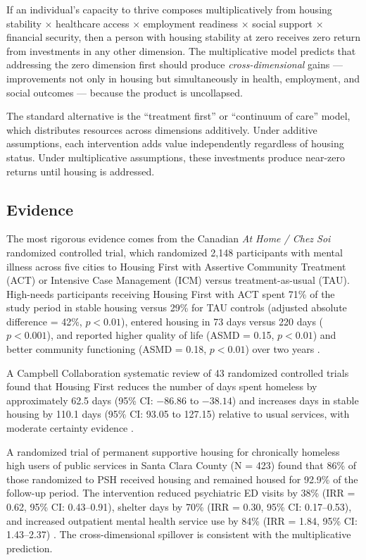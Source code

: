\documentclass[12pt]{article}
\begin{document}
If an individual's capacity to thrive composes multiplicatively from housing stability $\times$ healthcare access $\times$ employment readiness $\times$ social support $\times$ financial security, then a person with housing stability at zero receives zero return from investments in any other dimension. The multiplicative model predicts that addressing the zero dimension first should produce \emph{cross-dimensional} gains --- improvements not only in housing but simultaneously in health, employment, and social outcomes --- because the product is uncollapsed.

The standard alternative is the ``treatment first'' or ``continuum of care'' model, which distributes resources across dimensions additively. Under additive assumptions, each intervention adds value independently regardless of housing status. Under multiplicative assumptions, these investments produce near-zero returns until housing is addressed.

\subsection{Evidence}

The most rigorous evidence comes from the Canadian \emph{At Home / Chez Soi} randomized controlled trial, which randomized 2,148 participants with mental illness across five cities to Housing First with Assertive Community Treatment (ACT) or Intensive Case Management (ICM) versus treatment-as-usual (TAU). High-needs participants receiving Housing First with ACT spent 71\% of the study period in stable housing versus 29\% for TAU controls (adjusted absolute difference = 42\%, $p < 0.01$), entered housing in 73 days versus 220 days ($p < 0.001$), and reported higher quality of life (ASMD = 0.15, $p < 0.01$) and better community functioning (ASMD = 0.18, $p < 0.01$) over two years \citep{aubry2016oneyear, goering2014ahs}.

A Campbell Collaboration systematic review of 43 randomized controlled trials found that Housing First reduces the number of days spent homeless by approximately 62.5 days (95\% CI: $-86.86$ to $-38.14$) and increases days in stable housing by 110.1 days (95\% CI: 93.05 to 127.15) relative to usual services, with moderate certainty evidence \citep{munthekaas2018}.

A randomized trial of permanent supportive housing for chronically homeless high users of public services in Santa Clara County (N = 423) found that 86\% of those randomized to PSH received housing and remained housed for 92.9\% of the follow-up period. The intervention reduced psychiatric ED visits by 38\% (IRR = 0.62, 95\% CI: 0.43--0.91), shelter days by 70\% (IRR = 0.30, 95\% CI: 0.17--0.53), and increased outpatient mental health service use by 84\% (IRR = 1.84, 95\% CI: 1.43--2.37) \citep{raven2020}. The cross-dimensional spillover is consistent with the multiplicative prediction.
\end{document}
